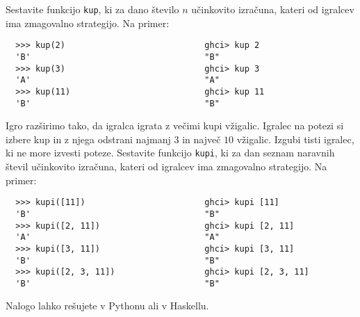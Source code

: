 \documentclass[arhiv]{../izpit}
\begin{document}
\podnaloga
  Sestavite funkcijo \texttt{kup}, ki za dano število $n$ učinkovito izračuna,
  kateri od igralcev ima zmagovalno strategijo. Na primer:
  \begin{verbatim}
  >>> kup(2)                            ghci> kup 2 
  'B'                                   "B"
  >>> kup(3)                            ghci> kup 3 
  'A'                                   "A"
  >>> kup(11)                           ghci> kup 11 
  'B'                                   "B"
  \end{verbatim}

\podnaloga 
  Igro razširimo tako, da igralca igrata z večimi kupi vžigalic. Igralec
  na potezi si izbere kup in z njega odstrani najmanj $3$ in največ $10$
  vžigalic. Izgubi tisti igralec, ki ne more izvesti poteze. 
  Sestavite funkcijo \texttt{kupi}, ki za dan seznam naravnih števil
  učinkovito izračuna, kateri od igralcev ima zmagovalno strategijo. Na primer:
  \begin{verbatim}
  >>> kupi([11])                        ghci> kupi [11]
  'B'                                   "B"
  >>> kupi([2, 11])                     ghci> kupi [2, 11]
  'A'                                   "A"
  >>> kupi([3, 11])                     ghci> kupi [3, 11]
  'B'                                   "B"
  >>> kupi([2, 3, 11])                  ghci> kupi [2, 3, 11]
  'B'                                   "B"
  \end{verbatim}
%
Nalogo lahko rešujete v Pythonu ali v Haskellu.
\end{document}
